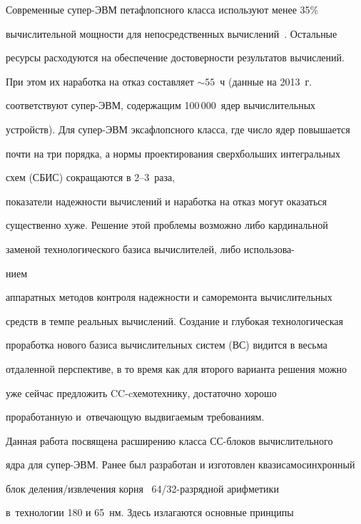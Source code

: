       Современные супер-ЭВМ петафлопсного класса используют менее 35\%

вычислительной мощности для непосредственных вычислений~\cite{1-st1}. Остальные

ресурсы расходуются на обеспечение достоверности результатов вычислений.

При этом их наработка на отказ составляет $\sim55$~ч (данные на 2013~г.\

соответствуют су\-пер-ЭВМ, содержащим 100\,000~ядер вычислительных

устройств). Для супер-ЭВМ эксафлопсного класса, где число ядер повышается

почти на три порядка, а нормы проектирования сверхбольших интегральных

схем (СБИС) сокращаются в 2--3~раза,

показатели надежности вычислений и наработка на отказ могут оказаться

существенно хуже. Решение этой проблемы возможно либо кардинальной

заменой технологического базиса вычислителей, либо использова-\linebreak\vspace*{-12pt}



\pagebreak



\noindent

нием

аппаратных методов контроля надежности и саморемонта вычислительных

средств в темпе реальных вычислений. Создание и глубокая технологическая

проработка нового базиса вычислительных систем (ВС) видится в весьма

отдаленной перспективе, в то время как для второго варианта решения можно

уже сейчас предложить CC-cхе\-мо\-тех\-ни\-ку, достаточно хорошо

проработанную и~отвечающую выдвигаемым требованиям.



      Данная работа посвящена расширению класса СС-блоков вычислительного

ядра для супер-ЭВМ. Ранее был разработан и изготовлен квазисамосинхронный

блок деления/извлечения корня~\cite{2-st1, 3-st1} 64/32-раз\-ряд\-ной арифметики

в~технологии 180 и 65~нм. Здесь излагаются основные принципы

